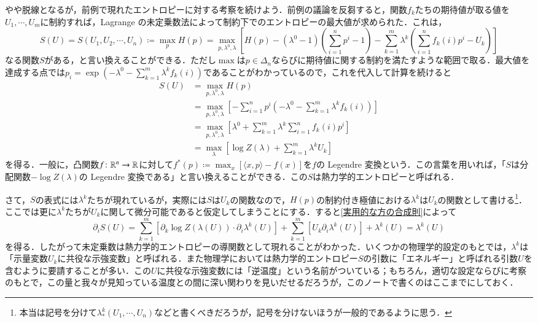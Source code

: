 \begin{exm}
やや脱線となるが，前例で現れたエントロピーに対する考察を続けよう．前例の議論を反芻すると，関数$f_k$たちの期待値が取る値を$U_1, \cdots, U_m$に制約すれば，Lagrange の未定乗数法によって制約下でのエントロピーの最大値が求められた．これは，
\begin{equation}
S(U) = S(U_1, U_2, \cdots, U_n) \coloneqq \max_{p} H(p) = \max_{p, \lambda^0, \lambda} \left[H(p) - (\lambda^0-1) \left(\sum_{i=1}^n p^i - 1\right) - \sum_{k=1}^m \lambda^k \left(\sum_{i=1}^n f_k(i) p^i - U_k\right) \right]
\end{equation}なる関数$S$がある，と言い換えることができる．ただし$\max$は$p\in \Delta_n$ならびに期待値に関する制約を満たすような範囲で取る．最大値を達成する点では$p_i = \exp\left(- \lambda^0 - \sum_{k=1}^m \lambda^k f_k(i) \right)$であることがわかっているので，これを代入して計算を続けると
\begin{align}
S(U) &= \max_{p,\lambda^0,\lambda} H(p) \\
&= \max_{p, \lambda^0, \lambda} \left[ -\sum_{i=1}^n p^i \left(-\lambda^0 - \sum_{k=1}^m \lambda^k f_k(i) \right) \right] \\
&= \max_{p, \lambda^0, \lambda} \left[ \lambda^0 + \sum_{k=1}^m \lambda^k \sum_{i=1}^n f_k(i)p^i  \right] \\
&= \max_{\lambda} \left[ \log Z(\lambda) + \sum_{k=1}^m \lambda^k  U_k  \right]
\end{align}を得る．一般に，凸関数$f \colon \mathbb{R}^n \to \mathbb{R}$に対して$f^*(p) \coloneqq \max_x \left[ \langle x,p \rangle - f(x) \right]$を$f$の Legendre 変換という．この言葉を用いれば，「$S$は分配関数$-\log Z(\lambda)$の Legendre 変換である」と言い換えることができる．この$S$は熱力学的エントロピーと呼ばれる．

さて，$S$の表式には$\lambda^k$たちが現れているが，実際には$S$は$U_k$の関数なので，$H(p)$の制約付き極値における$\lambda^k$は$U_k$の関数として書ける\footnote{本当は記号を分けて$\lambda^k_*(U_1,\cdots,U_n)$などと書くべきだろうが，記号を分けないほうが一般的であるように思う．}．ここでは更に$\lambda^k$たちが$U_k$に関して微分可能であると仮定してしまうことにする．すると\cref{実用的な方の合成則}によって
\begin{equation}
\partial_i S(U) = \sum_{k=1}^m \left[ \partial_k \log Z(\lambda(U)) \cdot \partial_i \lambda^k (U) \right] + \sum_{k=1}^m \left[U_k \partial_i \lambda^k(U) \right] + \lambda^k(U) = \lambda^k(U)
\end{equation}を得る．したがって未定乗数は熱力学的エントロピーの導関数として現れることがわかった．いくつかの物理学的設定のもとでは，$\lambda^k$は「示量変数$U_k$に共役な示強変数」と呼ばれる．また物理学においては熱力学的エントロピー$S$の引数に「エネルギー」と呼ばれる引数$U$を含むように要請することが多い．この$U$に共役な示強変数には「逆温度」という名前がついている；もちろん，適切な設定ならびに考察のもとで，この量と我々が見知っている温度との間に深い関わりを見いだせるだろうが，このノートで書くのはここまでにしておく．
\end{exm}

